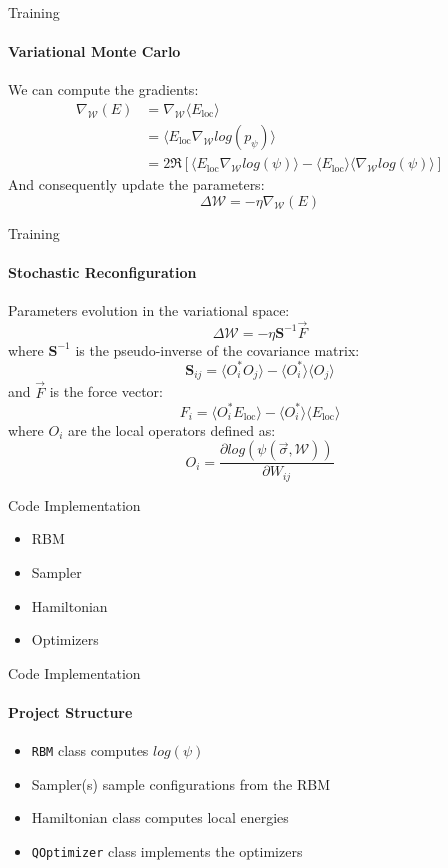 \documentclass{beamer}
\begin{document}
\begin{frame}{Training}
\framesubtitle{Variational Monte Carlo}
We can compute the gradients:
\begin{equation*}
\begin{aligned}
    \nabla_{\mathcal{W}} \left(E\right) &= \nabla_{\mathcal{W}} \langle E_{\text{loc}} \rangle \\
    &= \langle E_{\text{loc}} \nabla_{\mathcal{W}} log(p_{\psi}) \rangle \\
    &= 2 \mathfrak{R} \left[ \langle E_{\text{loc}} \nabla_{\mathcal{W}} log(\psi) \rangle - \langle E_{\text{loc}} \rangle \langle \nabla_{\mathcal{W}} log(\psi) \rangle \right]
\end{aligned}
\end{equation*}
And consequently update the parameters:
$$\Delta \mathcal{W} = - \eta \nabla_{\mathcal{W}} \left(E\right)$$
\end{frame}

\begin{frame}{Training}
\framesubtitle{Stochastic Reconfiguration}
Parameters evolution in the variational space:
$$\Delta \mathcal{W} = - \eta \mathbf{S}^{-1} \vec{F}$$
where $\mathbf{S}^{-1}$ is the pseudo-inverse of the covariance matrix:
$$\mathbf{S}_{ij} = \langle O_i^{*} O_j \rangle - \langle O_i^{*} \rangle \langle O_j \rangle$$
and $\vec{F}$ is the force vector:
$$F_i = \langle O_i^{*} E_{\text{loc}} \rangle - \langle O_i^{*} \rangle \langle E_{\text{loc}} \rangle$$
where $O_i$ are the local operators defined as:
$$O_i = \frac{\partial log\left(\psi\left( \vec{\sigma}, \mathcal{W} \right)\right)}{\partial W_{ij}}$$

\end{frame}

\begin{chapter}{}{Code Implementation}
\begin{itemize}
    \item RBM
    \item Sampler
    \item Hamiltonian
    \item Optimizers
\end{itemize}
\end{chapter}

\begin{frame}[fragile]{Code Implementation}
\framesubtitle{Project Structure}
\begin{itemize}
	\item \lstinline[style=kaolstplain]|RBM| class computes $log(\psi)$
	\item Sampler(s) sample configurations from the RBM
	\item Hamiltonian class computes local energies
	\item \lstinline[style=kaolstplain]|QOptimizer| class implements the optimizers
\end{itemize}
\end{frame}
\end{document}
